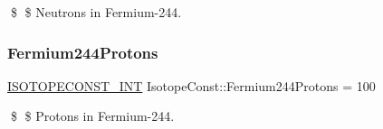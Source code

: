 \$ \$ Neutrons in Fermium-\/244. \mbox{\label{group___isotope_const-_fermium-_fm244_ga0fb9dcca7f09929c217c82c27d34f4b0}} 
\subsubsection{\texorpdfstring{Fermium244\+Protons}{Fermium244Protons}}
{\footnotesize\ttfamily \mbox{\hyperlink{group___isotope_const-_macros_ga5f18360b3e99483a35c32d789e62621c}{I\+S\+O\+T\+O\+P\+E\+C\+O\+N\+S\+T\+\_\+\+I\+NT}} Isotope\+Const\+::\+Fermium244\+Protons = 100}

\$ \$ Protons in Fermium-\/244. 
